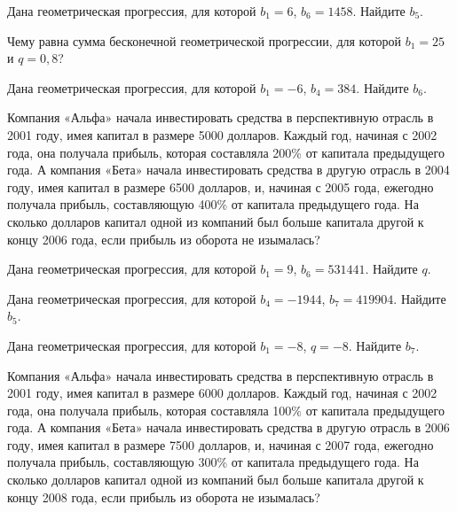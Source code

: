 \documentclass[4apaper]{article}
\begin{document}
\begin{taskBN}{48}
Дана геометрическая прогрессия, для которой $b_1 = 6$, $b_{6}=1458$. Найдите $b_{5}$.
\end{taskBN}

\begin{taskBN}{49}
Чему равна сумма бесконечной геометрической прогрессии, для которой $b_1 = 25$ и $q=0,8$?
\end{taskBN}

\begin{taskBN}{50}
Дана геометрическая прогрессия, для которой $b_1 = -6$, $b_{4}=384$. Найдите $b_{6}$.
\end{taskBN}

\begin{taskBN}{51}
Компания «Альфа» начала инвестировать средства в перспективную отрасль в 2001 году, имея капитал в размере 5000 долларов. Каждый год, начиная с 2002 года, она получала прибыль, которая составляла 200\% от капитала предыдущего года. А компания «Бета» начала инвестировать средства в другую отрасль в 2004 году, имея капитал в размере 6500 долларов, и, начиная с 2005 года, ежегодно получала прибыль, составляющую 400\% от капитала предыдущего года. На сколько долларов капитал одной из компаний был больше капитала другой к концу 2006 года, если прибыль из оборота не изымалась?
\end{taskBN}

\begin{taskBN}{52}
Дана геометрическая прогрессия, для которой $b_1 = 9$, $b_{6}=531441$. Найдите $q$.
\end{taskBN}

\begin{taskBN}{53}
Дана геометрическая прогрессия, для которой $b_{4} = -1944$, $b_{7}=419904$. Найдите $b_{5}$.
\end{taskBN}

\begin{taskBN}{54}
Дана геометрическая прогрессия, для которой $b_1 = -8$, $q=-8$. Найдите $b_{7}$.
\end{taskBN}

\begin{taskBN}{55}
Компания «Альфа» начала инвестировать средства в перспективную отрасль в 2001 году, имея капитал в размере 6000 долларов. Каждый год, начиная с 2002 года, она получала прибыль, которая составляла 100\% от капитала предыдущего года. А компания «Бета» начала инвестировать средства в другую отрасль в 2006 году, имея капитал в размере 7500 долларов, и, начиная с 2007 года, ежегодно получала прибыль, составляющую 300\% от капитала предыдущего года. На сколько долларов капитал одной из компаний был больше капитала другой к концу 2008 года, если прибыль из оборота не изымалась?
\end{taskBN}
\end{document}
